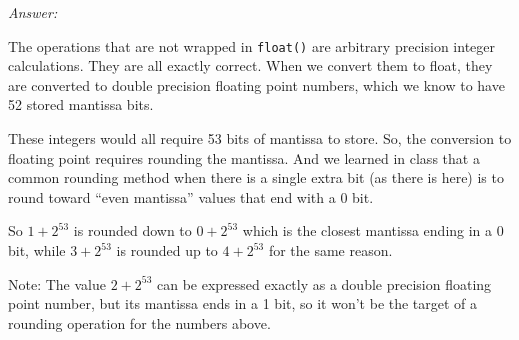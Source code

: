 \documentclass[11pt]{article}
\newcommand{\answer}{{\color{red}\textit{Answer: }}}
\begin{document}
\answer
{\color{blue}
The operations that are not wrapped in \verb+float()+ are arbitrary precision integer calculations.  They are all exactly correct.  When we convert them to float, they are converted to double precision floating point numbers, which we know to have 52 stored mantissa bits.

These integers would all require 53 bits of mantissa to store.  So, the conversion to floating point requires rounding the mantissa.  And we learned in class that a common rounding method when there is a single extra bit (as there is here) is to round toward ``even mantissa'' values that end with a 0 bit.

So $1 + 2^{53}$ is rounded down to $0+2^{53}$ which is the closest mantissa ending in a 0 bit, while $3+2^{53}$ is rounded up to $4+2^{53}$ for the same reason.  

Note: The value $2+2^{53}$ can be expressed exactly as a double precision floating point number, but its mantissa ends in a 1 bit, so it won't be the target of a rounding operation for the numbers above.
}
\end{document}
